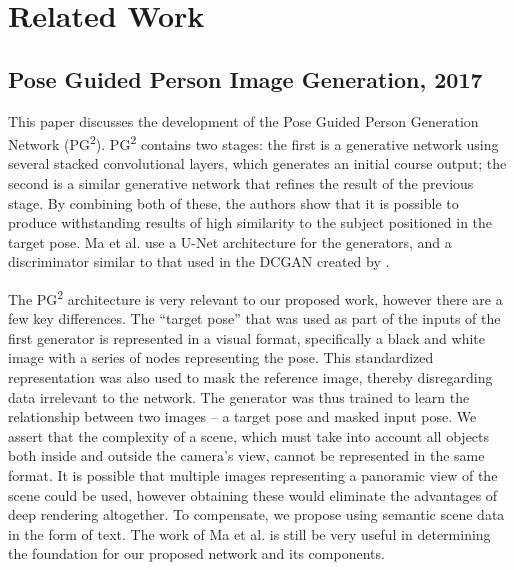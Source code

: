 \documentclass{article}
\begin{document}
\section{Related Work}
\label{sec:related}

\subsection*{Pose Guided Person Image Generation, 2017}
\nocite{pg2}
This paper discusses the development of the Pose Guided Person Generation
Network (PG\textsuperscript{2}). PG\textsuperscript{2} contains two stages:
the first is a generative network using several stacked convolutional layers,
which generates an initial course output;
the second is a similar generative network that refines the
result of the previous stage. By combining both of these,
the authors show that it is possible to produce withstanding results of
high similarity to the subject positioned in the target pose.
Ma et al. use a U-Net architecture for the generators, and a discriminator
similar to that used in the DCGAN created by
\cite{unsupervised_representational}.

The PG\textsuperscript{2} architecture is very relevant to our proposed work,
however there are a few key differences. The ``target pose'' that was used as 
part of the inputs of the first generator is represented in a visual format,
specifically a black and white image with a series of nodes representing the
pose. This standardized representation was also used to mask the reference image,
thereby disregarding data irrelevant to the network.
The generator was thus trained to learn the relationship between two
images -- a target pose and masked input pose. We assert that the complexity of a
scene, which must take into account all objects both
inside and outside the camera's view, cannot be represented in the same format.
It is possible that multiple images representing a panoramic view of the scene
could be used, however obtaining these would eliminate the advantages of deep
rendering altogether. To compensate, we propose using semantic scene data in the
form of text. The work of Ma et al. is still be very useful in determining the
foundation for our proposed network and its components.
\end{document}
